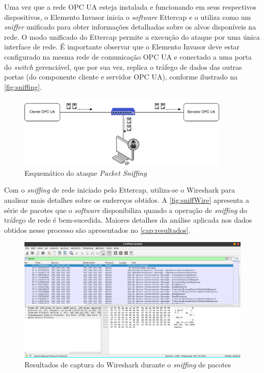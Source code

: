     Uma vez que a rede OPC UA esteja instalada e funcionando em seus respectivos dispositivos, o Elemento Invasor inicia o \textit{software} Ettercap e o utiliza como um \textit{sniffer} unificado para obter informações detalhadas sobre os alvos disponíveis na rede. O modo unificado do Ettercap permite a execução do ataque por uma única interface de rede. É importante observar que o Elemento Invasor deve estar configurado na mesma rede de comunicação OPC UA e conectado a uma porta do \textit{switch} gerenciável, que por sua vez, replica o tráfego de dados das outras portas (do componente cliente e servidor OPC UA), conforme ilustrado na \autoref{fig:sniffing}. 

    \begin{figure}[htbp]
        \caption{\label{fig:sniffing}Esquemático do ataque \textit{Packet Sniffing}}
        \begin{center}
            \includegraphics[width=0.9\textwidth]{USPSC-img/sniffing.png}
        \end{center}
    \end{figure}
    
    Com o \textit{sniffing} de rede iniciado pelo Ettercap, utiliza-se o Wireshark para analisar mais detalhes sobre os endereços obtidos. A \autoref{fig:sniffWire} apresenta a série de pacotes que o \textit{software} disponibiliza quando a operação de \textit{sniffing} do tráfego de rede é bem-sucedida. Maiores detalhes da análise aplicada nos dados obtidos nesse processo são apresentados no \autoref{cap:resultados}.

    \begin{figure}[htbp]
        \caption{\label{fig:sniffWire}Resultados de captura do Wireshark durante o \textit{sniffing} de pacotes}
        \begin{center}
            \includegraphics[width=1\textwidth]{USPSC-img/sniffWire.png}
        \end{center}
    \end{figure}
    
